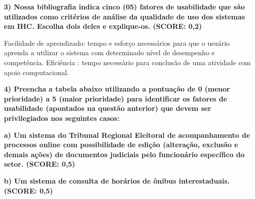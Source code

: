 \documentclass[
	article,			%
	11pt,				%
	oneside,			%
	a4paper,			%
	english,			%
	brazil,				%
	sumario=tradicional
	]{abntex2}
\begin{document}
\textbf{3) Nossa bibliografia indica cinco (05) fatores de usabilidade que são utilizados como critérios de análise da qualidade de uso dos sistemas em IHC. Escolha dois deles e explique-os. (SCORE: 0,2)}

Facilidade de aprendizado:  tempo e esforço necessários para que o usuário aprenda a utilizar o sistema com determinado nível de desempenho e competência.
Eficiência : tempo necessário para conclusão de uma atividade com apoio computacional.

\textbf{4) Preencha a tabela abaixo utilizando a pontuação de 0 (menor prioridade) a 5 (maior prioridade) para identificar os fatores de usabilidade (apontados na questão anterior) que devem ser privilegiados nos seguintes casos:}

\textbf{a) Um sistema do Tribunal Regional Eleitoral de acompanhamento de processos online com possibilidade de edição (alteração, exclusão e demais ações) de documentos judiciais pelo funcionário específico do setor. (SCORE: 0,5)}

\textbf{b) Um sistema de consulta de horários de ônibus interestaduais. (SCORE: 0,5)}
\end{document}
